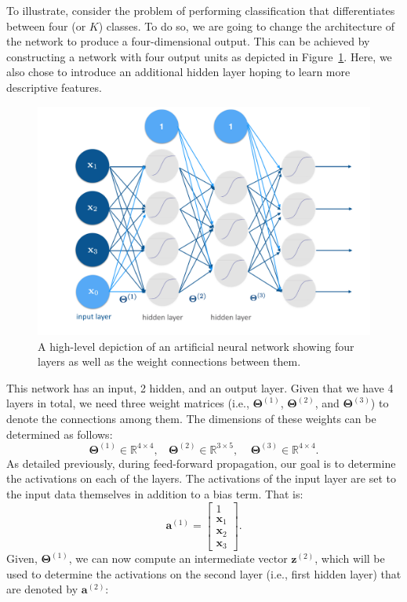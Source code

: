 To illustrate, consider the problem of performing classification that differentiates between four (or $K$) classes. To do so, we are going to change the architecture of the network to produce a four-dimensional output. This can be achieved by constructing a network with four output units as depicted in Figure~\ref{Fig:Network}. Here, we also chose to introduce an additional hidden layer hoping to learn more descriptive features. 


\begin{figure}[h!]
\centering 
\includegraphics[scale=.5]{Network}
\caption{A high-level depiction of an artificial neural network showing four layers as well as the weight connections between them.}
\label{Fig:Network}
\end{figure}

This network has an input, 2 hidden, and an output layer. Given that we have 4 layers in total, we need three weight matrices (i.e., $\bm{\Theta}^{(1)}$, $\bm{\Theta}^{(2)}$, and $\bm{\Theta}^{(3)}$) to denote the connections among them. The dimensions of these weights can be determined as follows: 
\begin{equation*}
\bm{\Theta}^{(1)} \in \mathbb{R}^{4 \times 4}, \ \ \ \ \bm{\Theta}^{(2)} \in \mathbb{R}^{3 \times 5}, \ \ \ \ \  \bm{\Theta}^{(3)} \in \mathbb{R}^{4 \times 4}. 
\end{equation*}
As detailed previously, during feed-forward propagation, our goal is to determine the activations on each of the layers. The activations of the input layer are set to the input data themselves in addition to a bias term. That is: 
\begin{equation*}
\bm{a}^{(1)} = \left[\begin{array}{c}
1\\
\bm{x}_{1}\\
\bm{x}_{2}\\
\bm{x}_{3}
\end{array}
\right].
\end{equation*}
Given, $\bm{\Theta}^{(1)}$, we can now compute an intermediate vector $\bm{z}^{(2)}$, which will be used to determine the activations on the second layer (i.e., first hidden layer) that are denoted by $\bm{a}^{(2)}$:

